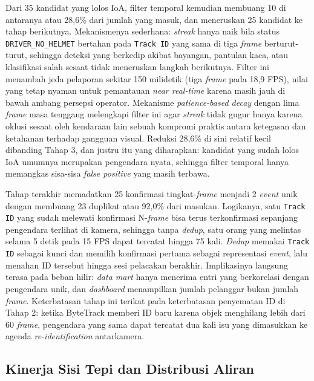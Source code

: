 Dari 35 kandidat yang lolos IoA, filter temporal kemudian membuang 10 di antaranya atau 28,6\% dari jumlah yang masuk, dan meneruskan 25 kandidat ke tahap berikutnya. Mekanismenya sederhana: \textit{streak} hanya naik bila status \texttt{DRIVER\_NO\_HELMET} bertahan pada \texttt{Track ID} yang sama di tiga \textit{frame} berturut-turut, sehingga deteksi yang berkedip akibat bayangan, pantulan kaca, atau klasifikasi salah sesaat tidak meneruskan langkah berikutnya. Filter ini menambah jeda pelaporan sekitar 150 milidetik (tiga \textit{frame} pada 18,9 FPS), nilai yang tetap nyaman untuk pemantauan \textit{near real-time} karena masih jauh di bawah ambang persepsi operator. Mekanisme \textit{patience-based decay} dengan lima \textit{frame} masa tenggang melengkapi filter ini agar \textit{streak} tidak gugur hanya karena oklusi sesaat oleh kendaraan lain sebuah kompromi praktis antara ketegasan dan ketahanan terhadap gangguan visual. Reduksi 28,6\% di sini relatif kecil dibanding Tahap 3, dan justru itu yang diharapkan: kandidat yang sudah lolos IoA umumnya merupakan pengendara nyata, sehingga filter temporal hanya memangkas sisa-sisa \textit{false positive} yang masih terbawa.

Tahap terakhir memadatkan 25 konfirmasi tingkat-\textit{frame} menjadi 2 \textit{event} unik dengan membuang 23 duplikat atau 92,0\% dari masukan. Logikanya, satu \texttt{Track ID} yang sudah melewati konfirmasi N-\textit{frame} bisa terus terkonfirmasi sepanjang pengendara terlihat di kamera, sehingga tanpa \textit{dedup}, satu orang yang melintas selama 5 detik pada 15 FPS dapat tercatat hingga 75 kali. \textit{Dedup} memakai \texttt{Track ID} sebagai kunci dan memilih konfirmasi pertama sebagai representasi \textit{event}, lalu menahan ID tersebut hingga sesi pelacakan berakhir. Implikasinya langsung terasa pada beban hilir: \textit{data mart} hanya menerima entri yang berkorelasi dengan pengendara unik, dan \textit{dashboard} menampilkan jumlah pelanggar bukan jumlah \textit{frame}. Keterbatasan tahap ini terikat pada keterbatasan penyematan ID di Tahap 2: ketika ByteTrack memberi ID baru karena objek menghilang lebih dari 60 \textit{frame}, pengendara yang sama dapat tercatat dua kali isu yang dimasukkan ke agenda \textit{re-identification} antarkamera.
% 
\subsection{Kinerja Sisi Tepi dan Distribusi Aliran}
\label{subsec:kinerja-edge-distribusi}


